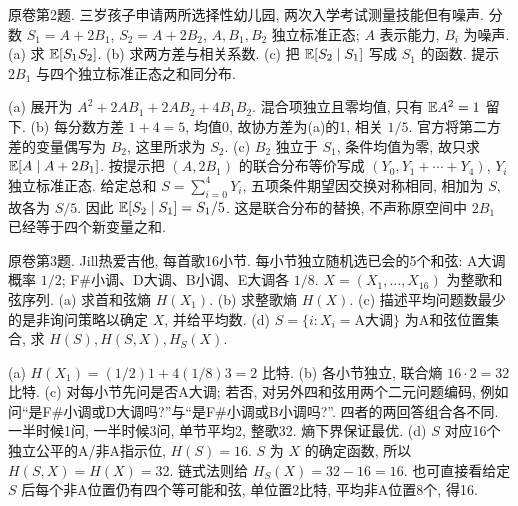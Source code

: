 \begin{exercise}\label{ex:flf19-2}
原卷第2题. 三岁孩子申请两所选择性幼儿园, 两次入学考试测量技能但有噪声. 分数 $S_1=A+2B_1$, $S_2=A+2B_2$, $A,B_1,B_2$ 独立标准正态; $A$ 表示能力, $B_i$ 为噪声. (a) 求 $\mathbb E[S_1S_2]$. (b) 求两方差与相关系数. (c) 把 $\mathbb E[S_2\mid S_1]$ 写成 $S_1$ 的函数. 提示 $2B_1$ 与四个独立标准正态之和同分布.
\end{exercise}
\begin{solution}
(a)\label{sol:flf19-2-a} 展开为 $A^2+2AB_1+2AB_2+4B_1B_2$. 混合项独立且零均值, 只有 $\mathbb E A^2=1$ 留下.
(b)\label{sol:flf19-2-b} 每分数方差 $1+4=5$, 均值0, 故协方差为(a)的1, 相关 $1/5$. 官方将第二方差的变量偶写为 $B_2$, 这里所求为 $S_2$.
(c)\label{sol:flf19-2-c} $B_2$ 独立于 $S_1$, 条件均值为零, 故只求 $\mathbb E[A\mid A+2B_1]$. 按提示把 $(A,2B_1)$ 的联合分布等价写成 $(Y_0,Y_1+\cdots+Y_4)$, $Y_i$ 独立标准正态. 给定总和 $S=\sum_{i=0}^4Y_i$, 五项条件期望因交换对称相同, 相加为 $S$, 故各为 $S/5$. 因此 $\mathbb E[S_2\mid S_1]=S_1/5$. 这是联合分布的替换, 不声称原空间中 $2B_1$ 已经等于四个新变量之和.
\end{solution}

\begin{exercise}\label{ex:flf19-3}
原卷第3题. Jill热爱吉他, 每首歌16小节. 每小节独立随机选已会的5个和弦: A大调概率 $1/2$; F\#小调、D大调、B小调、E大调各 $1/8$. $X=(X_1,\ldots,X_{16})$ 为整歌和弦序列. (a) 求首和弦熵 $H(X_1)$. (b) 求整歌熵 $H(X)$. (c) 描述平均问题数最少的是非询问策略以确定 $X$, 并给平均数. (d) $S=\{i:X_i=\text{A大调}\}$ 为A和弦位置集合, 求 $H(S),H(S,X),H_S(X)$.
\end{exercise}
\begin{solution}
(a)\label{sol:flf19-3-a} $H(X_1)=(1/2)1+4(1/8)3=2$ 比特.
(b)\label{sol:flf19-3-b} 各小节独立, 联合熵 $16\cdot2=32$ 比特.
(c)\label{sol:flf19-3-c} 对每小节先问是否A大调; 若否, 对另外四和弦用两个二元问题编码, 例如问``是F\#小调或D大调吗?''与``是F\#小调或B小调吗?''. 四者的两回答组合各不同. 一半时候1问, 一半时候3问, 单节平均2, 整歌32. 熵下界保证最优.
(d)\label{sol:flf19-3-d} $S$ 对应16个独立公平的A/非A指示位, $H(S)=16$. $S$ 为 $X$ 的确定函数, 所以 $H(S,X)=H(X)=32$. 链式法则给 $H_S(X)=32-16=16$. 也可直接看给定 $S$ 后每个非A位置仍有四个等可能和弦, 单位置2比特, 平均非A位置8个, 得16.
\end{solution}

